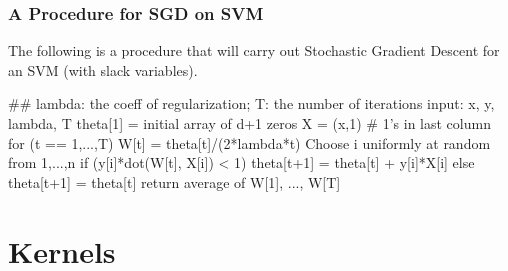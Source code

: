 \documentclass[smaller]{beamer}
\theoremstyle{example}
\begin{document}
\begin{frame}[fragile]
    \frametitle{A Procedure for SGD on SVM}
    The following is a procedure that will carry out Stochastic Gradient Descent for an SVM (with slack variables).

\begin{pseudo}
## lambda: the coeff of regularization; T: the number of iterations
input: x, y, lambda, T
theta[1] = initial array of d+1 zeros
X = (x,1) # 1's in last column
for (t == 1,...,T){
    W[t] = theta[t]/(2*lambda*t)
    Choose i uniformly at random from 1,...,n
    if (y[i]*dot(W[t], X[i]) < 1)
        theta[t+1] = theta[t] + y[i]*X[i]
    else 
        theta[t+1] = theta[t]
}
return average of W[1], ..., W[T]
\end{pseudo}
\end{frame}
\section{Kernels}
\end{document}
